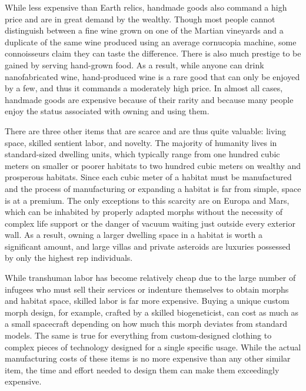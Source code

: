 While less expensive than Earth relics, handmade 
goods also command a high price and are in great 
demand by the wealthy. Though most people cannot 
distinguish between a fine wine grown on one of 
the Martian vineyards and a duplicate of the same 
wine produced using an average cornucopia machine, 
some connoisseurs claim they can taste the difference. 
There is also much prestige to be gained by serving 
hand-grown food. As a result, while anyone can drink 
nanofabricated wine, hand-produced wine is a rare 
good that can only be enjoyed by a few, and thus 
it commands a moderately high price. In almost all 
cases, handmade goods are expensive because of their 
rarity and because many people enjoy the status associated with owning and using them.

There are three other items that are scarce and 
are thus quite valuable: living space, skilled sentient 
labor, and novelty. The majority of humanity lives in 
standard-sized dwelling units, which typically range 
from one hundred cubic meters on smaller or poorer 
habitats to two hundred cubic meters on wealthy 
and prosperous habitats. Since each cubic meter of 
a habitat must be manufactured and the process of 
manufacturing or expanding a habitat is far from 
simple, space is at a premium. The only exceptions 
to this scarcity are on Europa and Mars, which can 
be inhabited by properly adapted morphs without 
the necessity of complex life support or the danger of 
vacuum waiting just outside every exterior wall. As 
a result, owning a larger dwelling space in a habitat 
is worth a significant amount, and large villas and 
private asteroids are luxuries possessed by only the 
highest rep individuals.

While transhuman labor has become relatively 
cheap due to the large number of infugees who must 
sell their services or indenture themselves to obtain 
morphs and habitat space, skilled labor is far more 
expensive. Buying a unique custom morph design, for 
example, crafted by a skilled biogeneticist, can cost as 
much as a small spacecraft depending on how much 
this morph deviates from standard models. The same 
is true for everything from custom-designed clothing 
to complex pieces of technology designed for a single 
specific usage. While the actual manufacturing costs 
of these items is no more expensive than any other 
similar item, the time and effort needed to design 
them can make them exceedingly expensive.

